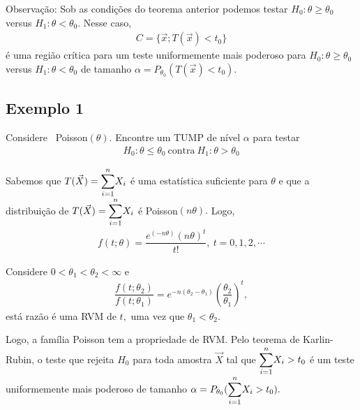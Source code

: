 \documentclass[12pt]{beamer}
\begin{document}
\begin{frame}{}
\begin{block}{Observação:}
\justifying
Sob as condições do teorema anterior podemos testar $H_{0}: \theta \geq \theta_0$ versus $H_{1}: \theta < \theta_0.$ Nesse caso, 
\begin{align*}
    C=\{\Vec{x};T(\Vec{x})< t_{0}\} 
\end{align*}
é uma região crítica para um teste uniformemente mais poderoso para $H_{0}: \theta \geq \theta_0$ versus $H_{1}: \theta < \theta_0$ de tamanho $\alpha=P_{\theta_{0}}(T(\Vec{x})< t_{0})$.
\end{block}
\end{frame}

\subsection{Exemplo 1}
\begin{frame}{}
\begin{block}{}
\justifying
Considere \seqX~Poisson$(\theta).$ Encontre um TUMP de nível $\alpha$ para testar 
\begin{align*}
    H_{0}:\theta\leq \theta_{0}~\text{contra}~H_{1}:\theta> \theta_{0}
\end{align*}
\end{block}
\pause
\begin{block}{}
\justifying
Sabemos que $T(\Vec{X})={\displaystyle \sum_{i=1}^{n}} X_{i}$ é uma estatística suficiente para $\theta$ e que a distribuição de $T(\Vec{X})={\displaystyle \sum_{i=1}^{n}} X_{i}$ é Poisson$(n\theta).$ Logo, 
\begin{align*}
    f(t;\theta)=\dfrac{e^{(-n\theta)}(n\theta)^{t}}{t!},~t=0,1,2,\cdots
\end{align*}
\end{block}
\end{frame}

\begin{frame}{}
\begin{block}{}
\justifying
Considere $0<\theta_{1}<\theta_{2}<\infty$ e
\begin{align*}
    \dfrac{f(t;\theta_{2})}{f(t;\theta_{1})}=e^{-n(\theta_{2}-\theta_{1})}\left(\dfrac{\theta_{2}}{\theta_{1}}\right)^{t},
\end{align*}
está razão é uma RVM de $t,$ uma vez que $\theta_{1}<\theta_{2}.$
\end{block}
\end{frame}

\begin{frame}{}
\begin{block}{}
\justifying
Logo, a família Poisson tem a propriedade de RVM. Pelo teorema de Karlin-Rubin, o teste que rejeita $H_{0}$ para toda amostra $\Vec{X}$ tal que ${\displaystyle \sum_{i=1}^{n}} X_{i}>t_{0}$ é um teste uniformemente mais poderoso de tamanho $\alpha=P_{\theta_{0}}({\displaystyle \sum_{i=1}^{n}} X_{i}>t_{0}).$
\end{block}
\end{frame}
\end{document}

